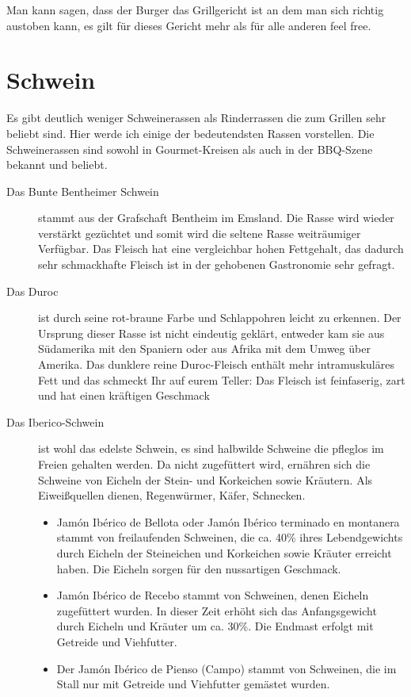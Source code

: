 Man kann sagen, dass der Burger das Grillgericht ist an dem man sich richtig austoben kann, es gilt für dieses Gericht mehr als für alle 
anderen \glqq feel free\grqq{}. 

\section{Schwein}

Es gibt deutlich weniger Schweinerassen als Rinderrassen die zum Grillen 
sehr beliebt 
sind. Hier werde ich einige der bedeutendsten Rassen vorstellen. Die 
Schweinerassen  sind sowohl in Gourmet-Kreisen als auch in der 
BBQ-Szene bekannt und beliebt.

\begin{description}
	\item[Das Bunte Bentheimer Schwein] stammt aus der Grafschaft 
	Bentheim im Emsland. Die Rasse wird wieder verstärkt gezüchtet und 
	somit wird die seltene Rasse weiträumiger Verfügbar. Das Fleisch hat 
	eine vergleichbar hohen Fettgehalt, das dadurch sehr schmackhafte 
	Fleisch ist in der gehobenen Gastronomie sehr gefragt.
	\item[Das Duroc] ist durch seine rot-braune Farbe und Schlappohren 
	leicht zu erkennen. Der Ursprung dieser Rasse ist nicht eindeutig 
	geklärt, entweder kam sie aus Südamerika mit den Spaniern oder 
	aus Afrika mit dem Umweg über Amerika. Das dunklere reine 
	Duroc-Fleisch enthält mehr intramuskuläres Fett und das schmeckt 
	Ihr auf eurem Teller: Das Fleisch ist feinfaserig, zart und hat einen 
	kräftigen Geschmack
	\item[Das Iberico-Schwein] ist wohl das edelste Schwein, es sind 
	halbwilde Schweine die pfleglos im Freien gehalten werden. Da nicht 
	zugefüttert wird, ernähren sich die Schweine von Eicheln der Stein- 
	und Korkeichen sowie Kräutern. Als Eiweißquellen dienen, 
	Regenwürmer, Käfer, Schnecken. 
	\begin{itemize}[noitemsep]
		\item Jamón Ibérico de Bellota oder Jamón Ibérico terminado en 
		montanera stammt von freilaufenden Schweinen, die ca. 40\% ihres 
		Lebendgewichts durch Eicheln der Steineichen und Korkeichen 
		sowie Kräuter erreicht haben. Die Eicheln sorgen für den nussartigen 
		Geschmack.
		\item Jamón Ibérico de Recebo stammt von Schweinen, denen Eicheln 
		zugefüttert wurden. In dieser Zeit erhöht sich das Anfangsgewicht 
		durch Eicheln und Kräuter um ca. 30\%. Die Endmast erfolgt mit 
		Getreide und Viehfutter.
		\item Der Jamón Ibérico de Pienso (Campo) stammt von Schweinen, 
		die im Stall nur mit Getreide und Viehfutter gemästet wurden.
	\end{itemize}
\end{description}




